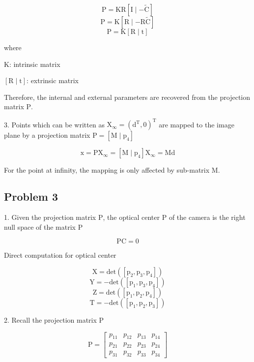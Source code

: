 \documentclass[conference]{IEEEtran}
\begin{document}
\[ \mathrm{P} = \mathrm{K}\mathrm{R}[\mathrm{I}\mid-\mathrm{\tilde{C}}] \]
\[ \mathrm{P} = \mathrm{K}[\mathrm{R}\mid-\mathrm{R}\mathrm{\tilde{C}}] \]
\[ \mathrm{P} = \mathrm{K}[\mathrm{R}\mid\mathrm{t}] \]

where

\begin{description}[font=$\bullet$~\normalfont\scshape\color{red!50!black}]
  \item \( \mathrm{K} \): intrinsic matrix
  \item \( [\mathrm{R}\mid\mathrm{t}] \): extrinsic matrix
\end{description}

Therefore, the internal and external parameters are recovered from the projection matrix \( \mathrm{P} \).

3. Points which can be written as \( \mathrm{X}_\infty = (\mathrm{d}^\mathrm{T}, 0)^\mathrm{T}\) are mapped to the image plane by a projection matrix \( \mathrm{P} = [\mathrm{M}\mid\mathrm{p}_4] \)

\[ \mathrm{x} = \mathrm{P}\mathrm{X}_\infty = [\mathrm{M}\mid\mathrm{p}_4]\mathrm{X}_\infty =
\mathrm{M}\mathrm{d} \] 

For the point at infinity, the mapping is only affected by sub-matrix \( \mathrm{M }\).

\clearpage
\subsection{Problem 3}

1. Given the projection matrix \( \mathrm{P} \), the optical center \( \mathrm{P} \) of the camera is the right null space of the matrix \( \mathrm{P} \)

\[ \mathrm{P}\mathrm{C} = 0 \] 

Direct computation for optical center

\[ \mathrm{X} = \mathrm{det}([\mathrm{p}_2,\mathrm{p}_3,\mathrm{p}_4]) \] 
\[ \mathrm{Y} = -\mathrm{det}([\mathrm{p}_1,\mathrm{p}_3,\mathrm{p}_4]) \]
\[ \mathrm{Z} = \mathrm{det}([\mathrm{p}_1,\mathrm{p}_2,\mathrm{p}_4]) \]
\[ \mathrm{T} = -\mathrm{det}([\mathrm{p}_1,\mathrm{p}_2,\mathrm{p}_3]) \]

2. Recall the projection matrix \( \mathrm{P} \)

\[ \mathrm{P} = \begin{bmatrix}
p_{11} & p_{12} & p_{13} & p_{14}  \\
p_{21} & p_{22} & p_{23} & p_{24}  \\
p_{31} & p_{32} & p_{33} & p_{34}  
\end{bmatrix}\]
\end{document}
